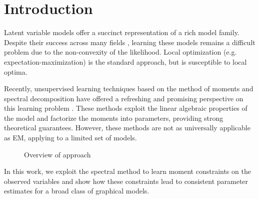 \section{Introduction}
\label{sec:introduction}

Latent variable models offer a succinct representation of a rich model
family. 
Despite their success across many fields
\cite{quattoni04crf,haghighi06prototype,liang06discrimative,kirkpatrick10painless},
learning these models remains a difficult problem due to the
non-convexity of the likelihood. Local optimization (e.g.
expectation-maximization) is the standard approach, but is susceptible
to local optima.

Recently, unsupervised learning techniques based on the method of moments and
spectral decomposition have offered a refreshing and promising perspective on
this learning problem \citep{hsu09spectral,anandkumar11tree,anandkumar12moments,anandkumar12lda,hsu12identifiability,balle11transducer,balle12automata}.
These methods exploit the linear algebraic properties of the model and
factorize the moments into parameters, providing strong theoretical guarantees.
However, these methods are not as universally applicable as EM, applying to a limited set of models.

\begin{figure}[t]
  \label{fig:approach}
  \centering
{}
  \caption{Overview of approach}
\end{figure}

In this work, we exploit the spectral method to learn moment constraints
on the observed variables and show how these constraints lead to consistent parameter estimates for a broad class of graphical models.

